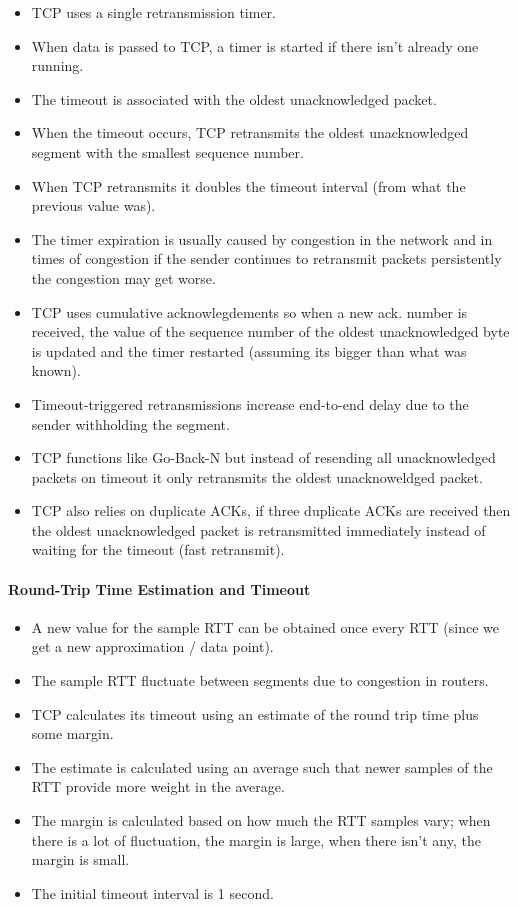\documentclass{article}
\begin{document}
\begin{itemize}
    \item TCP uses a single retransmission timer.
    \item When data is passed to TCP, a timer is started if there isn't already one running.
    \item The timeout is associated with the oldest unacknowledged packet.
    \item When the timeout occurs, TCP retransmits the oldest unacknowledged segment with the smallest sequence number.
    \item When TCP retransmits it doubles the timeout interval (from what the previous value was).
    \item The timer expiration is usually caused by congestion in the network and in times of congestion if the sender continues to retransmit packets persistently the congestion may get worse.
    \item TCP uses cumulative acknowlegdements so when a new ack. number is received, the value of the sequence number of the oldest unacknowledged byte is updated and the timer restarted (assuming its bigger than what was known).
    \item Timeout-triggered retransmissions increase end-to-end delay due to the sender withholding the segment.
    \item TCP functions like Go-Back-N but instead of resending all unacknowledged packets on timeout it only retransmits the oldest unacknoweldged packet.
    \item TCP also relies on duplicate ACKs, if three duplicate ACKs are received then the oldest unacknowledged packet is retransmitted immediately instead of waiting for the timeout (fast retransmit).
\end{itemize}

\paragraph{Round-Trip Time Estimation and Timeout}

\begin{itemize}
    \item A new value for the sample RTT can be obtained once every RTT (since we get a new approximation / data point).
    \item The sample RTT fluctuate between segments due to congestion in routers.
    \item TCP calculates its timeout using an estimate of the round trip time plus some margin.
    \item The estimate is calculated using an average such that newer samples of the RTT provide more weight in the average.
    \item The margin is calculated based on how much the RTT samples vary; when there is a lot of fluctuation, the margin is large, when there isn't any, the margin is small.
    \item The initial timeout interval is 1 second.
\end{itemize}
\end{document}
